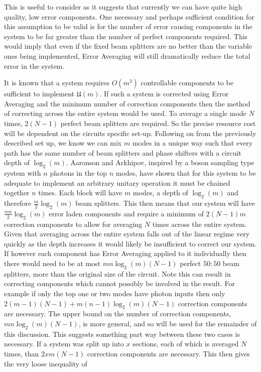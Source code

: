 \documentclass[aps,pra,twocolumn,superscriptaddress,numerical]{revtex4-1}
\begin{document}
		This is useful to consider as it suggests that currently we can have quite high quality, low error components. One necessary and perhaps sufficient condition for this assumption to be valid is for the number of error causing components in the system to be far greater than the number of perfect components required. This would imply that even if the fixed beam splitters are no better than the variable ones being implemented, Error Averaging will still dramatically reduce the total error in the system. 
		
		It is known \cite{reck} that a system requires $O\left(m^{2}\right)$ controllable components to be sufficient to implement $\mathfrak{U}\left(m\right)$. If such a system is corrected using Error Averaging and the minimum number of correction components then the method of correcting across the entire system would be used. To average a single mode $N$ times, $2\left(N-1\right)$ perfect beam splitters are required. So the precise resource cost will be dependent on the circuits specific set-up. Following on from the previously described set up, we know we can mix $m$ modes in a unique way such that every path has the same number of beam splitters and phase shifters with a circuit depth of $\log_{2}\left(m\right)$. Aaronson and Arkhipov, inspired by a boson sampling type system with $n$ photons in the top $n$ modes, have shown \cite{Boson} that for this system to be adequate to implement an arbitrary unitary operation it must be chained together $n$ times. Each block will have $m$ modes, a depth of $\log_{2}\left(m\right)$ and therefore $\frac{m}{2}\log_{2}\left(m\right)$ beam splitters.	This then means that our system will have $\frac{mn}{2}\log_{2}\left(m\right)$ error laden components and require a minimum of $2\left(N-1\right)m$ correction components to allow for averaging $N$ times across the entire system. Given that averaging across the entire system falls out of the linear regime very quickly as the depth increases it would likely	be insufficient to correct our system. If however each component has Error Averaging applied to it individually then there would need to be at most $mn\log_{2}\left(m\right)\left(N-1\right)$ perfect $50:50$ beam splitters, more than the original size of the circuit. Note this can result in correcting components which cannot possibly be involved	in the result. For example if only the top one or two modes have photon inputs then only $2\left(m-1\right)\left(N-1\right)+m\left(n-1\right)\log_{2}\left(m\right)\left(N-1\right)$	correction components are necessary. The upper bound on the number of correction components, $mn\log_{2}\left(m\right)\left(N-1\right)$, is more general, and so will be used for the remainder of this discussion. This suggests something part way between these two cases is necessary. If a system was split	up into $x$ sections, each of which is averaged $N$ times, than $2xm\left(N-1\right)$ correction components are necessary. This then gives the very loose inequality of 
		
\end{document}
